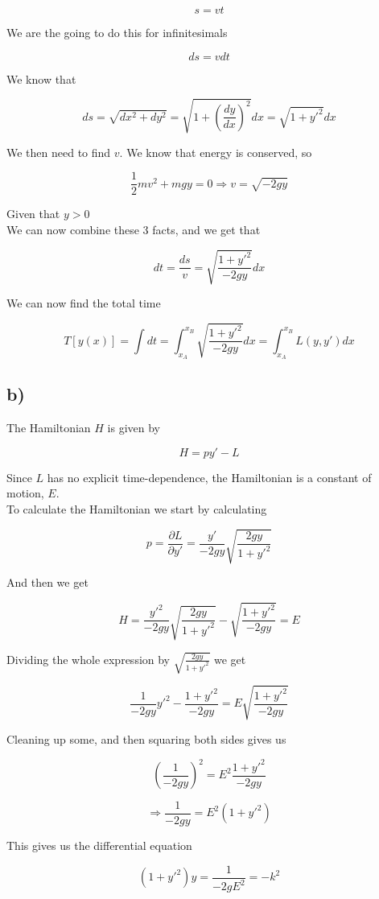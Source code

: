 \documentclass[a4paper,norsk, 10pt]{article}
\begin{document}
$$
s = vt
$$

We are the going to do this for infinitesimals

$$
ds = v dt 
$$

We know that 

$$
ds = \sqrt{dx^2 + dy^2} =\sqrt{1 + \left(\frac{dy}{dx}\right)^2}dx= \sqrt{1 +y'^2} dx
$$

We then need to find $v$. We know that energy is conserved, so

$$
\frac{1}{2}mv^2 + mgy = 0 \Rightarrow v = \sqrt{-2gy}
$$

Given that $y>0$\\
We can now combine these 3 facts, and we get that

$$
dt = \frac{ds}{v} = \sqrt{\frac{1 + y'^2}{-2gy}}dx
$$

We can now find the total time

$$
T[y(x)] = \int dt = \int_{x_A}^{x_B} \sqrt{\frac{1 + y'^2}{-2gy}}dx = \int_{x_A}^{x_B} L(y,y') dx
$$




\subsection*{b)}
The Hamiltonian $H$ is given by

$$
H = py' - L
$$

Since $L$ has no explicit time-dependence, the Hamiltonian is a constant of motion, $E$.\\

To calculate the Hamiltonian we start by calculating

$$
p = \frac{\partial L}{\partial y'} = \frac{y'}{-2gy}\sqrt{\frac{2gy}{1+y'^2}}
$$

And then we get

$$
H = \frac{y'^2}{-2gy}\sqrt{\frac{2gy}{1+y'^2}} - \sqrt{\frac{1 + y'^2}{-2gy}} = E
$$

Dividing the whole expression by $\sqrt{\frac{2gy}{1+y'^2}}$ we get

$$
\frac{1}{-2gy}y'^2 - \frac{1+y'^2}{-2gy} = E \sqrt{\frac{1 + y'^2}{-2gy}}
$$

Cleaning up some, and then squaring both sides gives us

$$
\left(\frac{1}{-2gy}\right)^2 = E^2\frac{1+y'^2}{-2gy}
$$

$$
\Rightarrow \frac{1}{-2gy} = E^2(1+y'^2)
$$

This gives us the differential equation

\begin{equation}
(1+y'^2)y = \frac{1}{-2gE^2} = -k^2
\label{eq:diff}
\end{equation}
\end{document}
